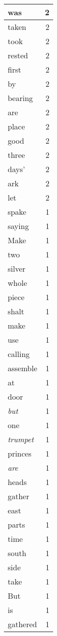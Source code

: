 \begin{center}
\begin{longtable}{l|r}
was & 2 \\ \hline
taken & 2 \\ \hline
took & 2 \\ \hline
rested & 2 \\ \hline
first & 2 \\ \hline
by & 2 \\ \hline
bearing & 2 \\ \hline
are & 2 \\ \hline
place & 2 \\ \hline
good & 2 \\ \hline
three & 2 \\ \hline
days' & 2 \\ \hline
ark & 2 \\ \hline
let & 2 \\ \hline
spake & 1 \\ \hline
saying & 1 \\ \hline
Make & 1 \\ \hline
two & 1 \\ \hline
silver & 1 \\ \hline
whole & 1 \\ \hline
piece & 1 \\ \hline
shalt & 1 \\ \hline
make & 1 \\ \hline
use & 1 \\ \hline
calling & 1 \\ \hline
assemble & 1 \\ \hline
at & 1 \\ \hline
door & 1 \\ \hline
\emph{but} & 1 \\ \hline
one & 1 \\ \hline
\emph{trumpet} & 1 \\ \hline
princes & 1 \\ \hline
\emph{are} & 1 \\ \hline
heads & 1 \\ \hline
gather & 1 \\ \hline
east & 1 \\ \hline
parts & 1 \\ \hline
time & 1 \\ \hline
south & 1 \\ \hline
side & 1 \\ \hline
take & 1 \\ \hline
But & 1 \\ \hline
is & 1 \\ \hline
gathered & 1 \\ \hline

\end{longtable}
\end{center}
